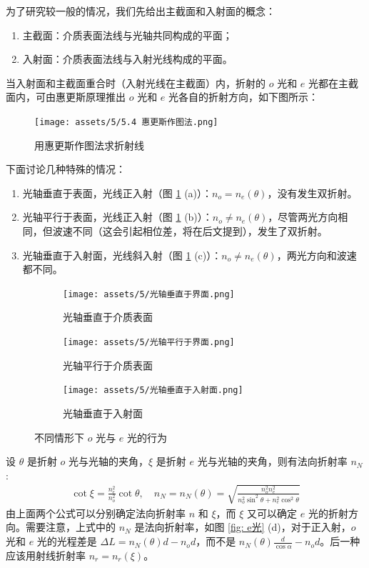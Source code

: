 \documentclass[UTF8]{report}
\theoremstyle{MyLineTheoremStyle} %
\theoremstyle{MyBlockTheoremStyle} %
\theoremstyle{MySubsubsectionStyle} %
\begin{document}
为了研究较一般的情况，我们先给出主截面和入射面的概念：
\begin{enumerate}
\item 主截面：介质表面法线与光轴共同构成的平面；
\item 入射面：介质表面法线与入射光线构成的平面。
\end{enumerate}
当入射面和主截面重合时（入射光线在主截面）内，折射的 $o$ 光和 $e$ 光都在主截面内，可由惠更斯原理推出 $o$ 光和 $e$ 光各自的折射方向，如下图所示：
\begin{figure}[H]\centering
    \texttt{[image: assets/5/5.4 惠更斯作图法.png]}
    \caption{用惠更斯作图法求折射线}
\end{figure}
下面讨论几种特殊的情况：
\begin{enumerate}
\item 光轴垂直于表面，光线正入射（图 \ref{fig:oe} (a)）：$n_o = n_e(\theta)$，没有发生双折射。
\item 光轴平行于表面，光线正入射（图 \ref{fig:oe} (b)）：$n_o \ne n_e(\theta)$，尽管两光方向相同，但波速不同（这会引起相位差，将在后文提到），发生了双折射。
\item 光轴垂直于入射面，光线斜入射（图 \ref{fig:oe} (c)）：$n_o \ne n_e(\theta)$，两光方向和波速都不同。
\end{enumerate}
\begin{figure}[H]\centering
\begin{subfigure}[b]{0.39\columnwidth}\centering
    \texttt{[image: assets/5/光轴垂直于界面.png]}
    \caption{光轴垂直于介质表面}
\end{subfigure}\hfill
\begin{subfigure}[b]{0.34\columnwidth}\centering
    \texttt{[image: assets/5/光轴平行于界面.png]}
    \caption{光轴平行于介质表面}
\end{subfigure}
\begin{subfigure}[b]{0.26\columnwidth}\centering
    \texttt{[image: assets/5/光轴垂直于入射面.png]}
    \caption{光轴垂直于入射面}
\end{subfigure}
\caption{不同情形下 $o$ 光与 $e$ 光的行为}
\label{fig:oe}
\end{figure}



设 $\theta$ 是折射 $o$ 光与光轴的夹角，$\xi$ 是折射 $e$ 光与光轴的夹角，则有法向折射率 $n_N$ : 
\begin{gather}
    \cot \xi = \frac{n_e^2}{n_o^2} \cot \theta,\quad  n_N = n_N(\theta) = \sqrt{ \frac{n_o^2n_e^2}{n_o^2\sin^2 \theta + n_e^2\cos^2 \theta} }
\end{gather}
由上面两个公式可以分别确定法向折射率 $n$ 和 $\xi$，而 $\xi$ 又可以确定 $e$ 光的折射方向。需要注意，上式中的 $n_N$ 是法向折射率，如图 \ref{fig: e光} (d)，对于正入射，$o$ 光和 $e$ 光的光程差是 $\Delta L =  n_N(\theta)d - n_od$，而不是 $n_N(\theta) \frac{d}{\cos \alpha} - n_od$。后一种应该用射线折射率 $n_r = n_r(\xi)$。
\end{document}
